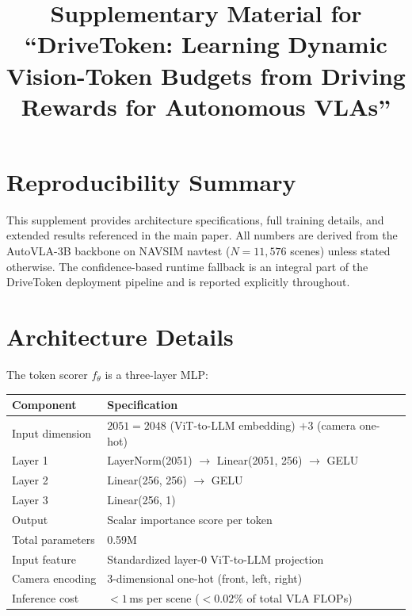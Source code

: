 \documentclass[letterpaper]{article}
\begin{document}
\title{Supplementary Material for ``DriveToken: Learning Dynamic Vision-Token Budgets from Driving Rewards for Autonomous VLAs''}

\maketitle

\section{Reproducibility Summary}

This supplement provides architecture specifications, full training details, and
extended results referenced in the main paper. All numbers are derived from the
AutoVLA-3B backbone on NAVSIM navtest ($N{=}11{,}576$ scenes) unless stated
otherwise. The confidence-based runtime fallback is an integral part of the
DriveToken deployment pipeline and is reported explicitly throughout.

\section{Architecture Details}
\label{sec:arch}

The token scorer $f_\theta$ is a three-layer MLP:
\begin{center}
\begin{tabular}{@{}ll@{}}
\toprule
Component & Specification \\
\midrule
Input dimension & $2051 = 2048$ (ViT-to-LLM embedding) $+ 3$ (camera one-hot) \\
Layer 1 & LayerNorm(2051) $\to$ Linear(2051, 256) $\to$ GELU \\
Layer 2 & Linear(256, 256) $\to$ GELU \\
Layer 3 & Linear(256, 1) \\
Output & Scalar importance score per token \\
Total parameters & 0.59M \\
\midrule
Input feature & Standardized layer-0 ViT-to-LLM projection \\
Camera encoding & 3-dimensional one-hot (front, left, right) \\
Inference cost & $<1$\,ms per scene ($<0.02\%$ of total VLA FLOPs) \\
\bottomrule
\end{tabular}
\end{center}
\end{document}

